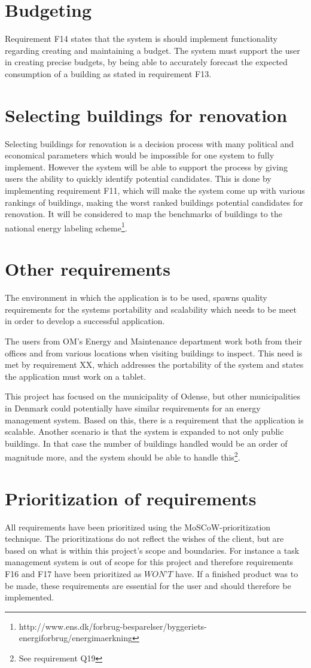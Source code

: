 \section{Budgeting}
Requirement F14 states that the system is should implement functionality regarding creating and maintaining a budget. The system must support the user in creating precise budgets, by being able to accurately forecast the expected consumption of a building as stated in requirement F13.
\section{Selecting buildings for renovation}
Selecting buildings for renovation is a decision process with many political and economical parameters which would be impossible for one system to fully implement. However the system will be able to support the process by giving users the ability to quickly identify potential candidates. This is done by implementing requirement F11, which will make the system come up with various rankings of buildings, making the worst ranked buildings potential candidates for renovation. It will be considered to map the benchmarks of buildings to the national energy labeling scheme\footnote{ http://www.ens.dk/forbrug-besparelser/byggeriets-energiforbrug/energimaerkning }.
\section{Other requirements}
The environment in which the application is to be used, spawns quality requirements for the systems portability and scalability which needs to be meet in order to develop a successful application. 

The users from OM’s Energy and Maintenance department work both from their offices and from various locations when visiting buildings to inspect. This need is met by requirement XX, which addresses the portability of the system and states the application must work on a tablet. 

This project has focused on the municipality of Odense, but other municipalities in Denmark could potentially have similar requirements for an energy management system. Based on this, there is a requirement that the application is scalable. Another scenario is that the system is expanded to not only public buildings. In that case the number of buildings handled would be an order of magnitude more, and the system should be able to handle this\footnote{See requirement Q19}. 
\section{Prioritization of requirements}
All requirements have been prioritized using the MoSCoW-prioritization technique. The prioritizations do not reflect the wishes of the client,  but are based on what is within this project's scope and boundaries. For instance a task management system is out of scope for this project and therefore requirements F16 and F17 have been prioritized as $WON’T$ have. If a finished product was to be made, these requirements are essential for the user and should therefore be implemented.
